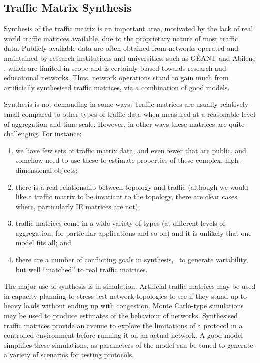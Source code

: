\subsection{Traffic Matrix Synthesis}

Synthesis of the traffic matrix is an important area, motivated by the
lack of real world traffic matrices available, due to the proprietary
nature of most traffic data. Publicly available data are often obtained
from networks operated and maintained by research institutions and
universities, such as G\'{E}ANT \cite{GEANT} and Abilene
\cite{Abilene}, which are limited in scope and is certainly biased
towards research and educational networks.
Thus, network operations stand to gain much from artificially
synthesised traffic matrices, via a combination of good models.

Synthesis is not demanding in some ways. Traffic matrices are usually
relatively small compared to other types of traffic data when
measured at a reasonable level of aggregation and time scale. However,
in other ways these matrices are quite challenging. For instance:
\begin{enumerate}

\item we have few sets of traffic matrix data, and even fewer that are
  public, and somehow need to use these to estimate properties of
  these complex, high-dimensional objects;

\item there is a real relationship between topology and traffic
  (although we would like a traffic matrix to be invariant to the
  topology, there are clear cases where, particularly IE matrices are
  not);

\item traffic matrices come in a wide variety of types (at different
  levels of aggregation, for particular applications and so on) and it
  is unlikely that one model fits all; and 

\item there are a number of conflicting goals in synthesis, \eg~to
  generate variability, but well ``matched'' to real traffic
  matrices. 
\end{enumerate}

The major use of synthesis is in simulation. Artificial traffic matrices may 
be used in capacity planning to stress
test network topologies to see if they stand up to heavy loads without
ending up with congestion. Monte Carlo-type simulations may be used to
produce estimates of the behaviour of networks. Synthesised traffic
matrices provide an avenue to explore the limitations of a protocol in
a controlled environment before running it on an actual network. A
good model simplifies these simulations, as parameters of the model
can be tuned to generate a variety of scenarios for testing protocols.

